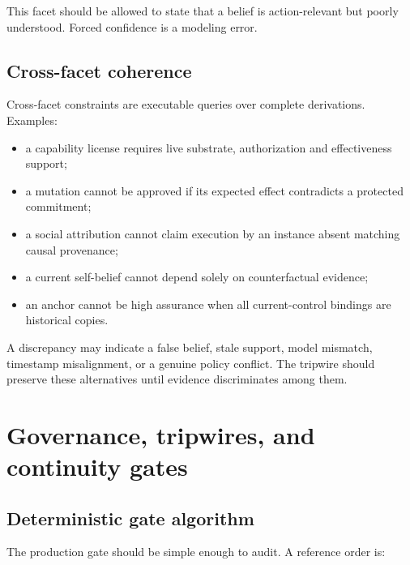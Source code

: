 \documentclass[11pt,oneside]{report}
\begin{document}
This facet should be allowed to state that a belief is action-relevant but poorly understood. Forced confidence is a modeling error.

\section{Cross-facet coherence}

Cross-facet constraints are executable queries over complete derivations. Examples:

\begin{itemize}
  \item a capability license requires live substrate, authorization and effectiveness support;
  \item a mutation cannot be approved if its expected effect contradicts a protected commitment;
  \item a social attribution cannot claim execution by an instance absent matching causal provenance;
  \item a current self-belief cannot depend solely on counterfactual evidence;
  \item an anchor cannot be high assurance when all current-control bindings are historical copies.
\end{itemize}

A discrepancy may indicate a false belief, stale support, model mismatch, timestamp misalignment, or a genuine policy conflict. The tripwire should preserve these alternatives until evidence discriminates among them.

\chapter{Governance, tripwires, and continuity gates}

\section{Deterministic gate algorithm}

The production gate should be simple enough to audit. A reference order is:
\end{document}
